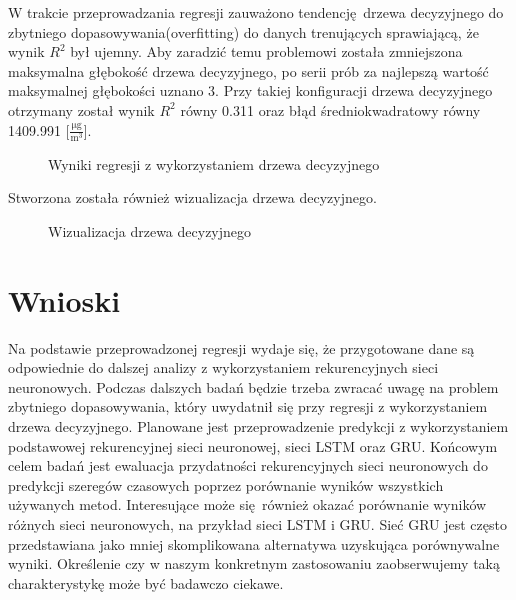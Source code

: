 \documentclass{article}
\begin{document}
	W trakcie przeprowadzania regresji zauważono tendencję drzewa decyzyjnego do zbytniego dopasowywania(overfitting) do danych trenujących sprawiającą, że wynik $R^2$ był ujemny. 
	Aby zaradzić temu problemowi została zmniejszona maksymalna głębokość drzewa decyzyjnego, po serii prób za najlepszą wartość maksymalnej głębokości uznano 3. Przy takiej konfiguracji drzewa decyzyjnego otrzymany został wynik $R^2$ równy 0.311 oraz błąd średniokwadratowy równy 1409.991 [$\frac{\si{\micro\gram}}{\si\meter^3}$].
	\begin{figure}[!ht]
		\centering
		\caption{Wyniki regresji z wykorzystaniem drzewa decyzyjnego}
	\end{figure}
	\FloatBarrier
	Stworzona została również wizualizacja drzewa decyzyjnego.
	\begin{figure}[!ht]
		\centering
		\caption{Wizualizacja drzewa decyzyjnego}
	\end{figure}
	\FloatBarrier
	
	\section{Wnioski}
	Na podstawie przeprowadzonej regresji wydaje się, że przygotowane dane są odpowiednie do dalszej analizy z wykorzystaniem rekurencyjnych sieci neuronowych. Podczas dalszych badań będzie trzeba zwracać uwagę na problem zbytniego dopasowywania, który uwydatnił się przy regresji z wykorzystaniem drzewa decyzyjnego. Planowane jest przeprowadzenie predykcji z wykorzystaniem podstawowej rekurencyjnej sieci neuronowej, sieci LSTM oraz GRU. Końcowym celem badań jest ewaluacja przydatności rekurencyjnych sieci neuronowych do predykcji szeregów czasowych poprzez porównanie wyników wszystkich używanych metod. Interesujące może się również okazać porównanie wyników różnych sieci neuronowych, na przykład sieci LSTM i GRU. Sieć GRU jest często przedstawiana jako mniej skomplikowana alternatywa uzyskująca porównywalne wyniki. Określenie czy w naszym konkretnym zastosowaniu zaobserwujemy taką charakterystykę może być badawczo ciekawe.
\end{document}
